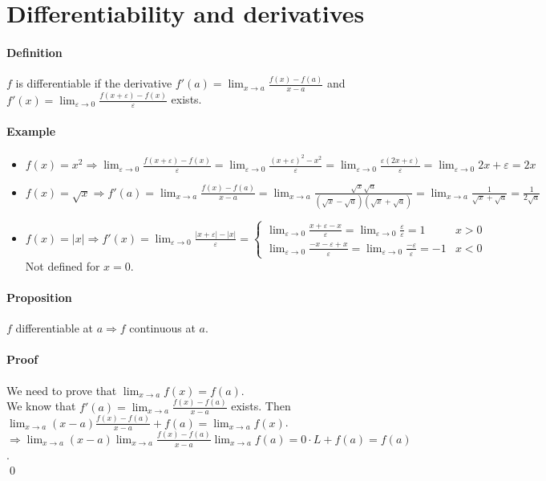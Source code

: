 \documentclass{article}
\newcommand{\DS}{\displaystyle}
\newcommand{\lime}{\lim_{\varepsilon \to 0}}
\newcommand{\limx}[1]{\lim_{x \to #1}}
\newcommand{\Ep}{\varepsilon}
\newcommand{\Def}{\paragraph{Definition}}
\newcommand{\Proposition}{\paragraph{Proposition}}
\newcommand{\Proof}{\paragraph{Proof}}
\newcommand{\Example}{\paragraph{Example}}
\begin{document}
\section{Differentiability and derivatives}

  \Def $f$ is differentiable if the derivative $\DS f'(a) = \limx{a}
  \frac{f(x)-f(a)}{x-a}$ and $\DS f'(x) = \lime \frac{f(x+\Ep)-f(x)}{\Ep}$
  exists.

  \Example
  \begin{itemize}
    \item $\DS f(x) = x^2 \Rightarrow \lime \frac{f(x+\Ep)-f(x)}{\Ep} =
    \lime \frac{(x+\Ep)^2 - x^2}{\Ep} = \lime \frac{\Ep (2x + \Ep)}{\Ep} =
    \lime 2x + \Ep = 2x$

    \item $\DS f(x) = \sqrt{x} \Rightarrow f'(a) =
    \limx{a} \frac{f(x)-f(a)}{x-a} =
    \limx{a} \frac{\sqrt{x} \sqrt{a}}{(\sqrt{x}-\sqrt{a})(\sqrt{x}+\sqrt{a})} =
    \limx{a} \frac{1}{\sqrt{x}+\sqrt{a}} = \frac{1}{2\sqrt{a}}$

    \item $\DS f(x) = |x| \Rightarrow f'(x) = \lime \frac{|x+\Ep| - |x|}{\Ep} =
    \begin{cases}
      \lime \frac{x + \Ep - x}{\Ep} = \lime \frac{\Ep}{\Ep} = 1 & x > 0 \\
      \lime \frac{-x - \Ep + x}{\Ep} = \lime \frac{-\Ep}{\Ep} = -1 & x < 0
    \end{cases}$
  \\Not defined for $x = 0$.
  \end{itemize}

  \Proposition $f$ differentiable at $a \Rightarrow f$ continuous at $a$.

  \Proof We need to prove that $\DS \limx{a} f(x) = f(a)$.
\\We know that $f'(a) = \limx{a} \frac{f(x)-f(a)}{x-a}$ exists. Then
  $\DS \limx{a} (x-a) \frac{f(x)-f(a)}{x-a} + f(a) = \limx{a} f(x)$.
\\$\DS \Rightarrow \limx{a}(x-a) \limx{a} \frac{f(x)-f(a)}{x-a} \limx{a}f(a) =
  0 \cdot L + f(a) = f(a)$.
\\\qed
\end{document}
